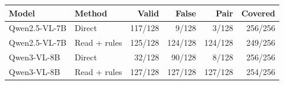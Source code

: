 \begin{tabular}{llrrrr}
\toprule
Model & Method & Valid & False & Pair & Covered \\
\midrule
Qwen2.5-VL-7B & Direct & 117/128 & 9/128 & 3/128 & 256/256 \\
Qwen2.5-VL-7B & Read + rules & 125/128 & 124/128 & 124/128 & 249/256 \\
Qwen3-VL-8B & Direct & 32/128 & 90/128 & 8/128 & 256/256 \\
Qwen3-VL-8B & Read + rules & 127/128 & 127/128 & 127/128 & 254/256 \\
\bottomrule
\end{tabular}
